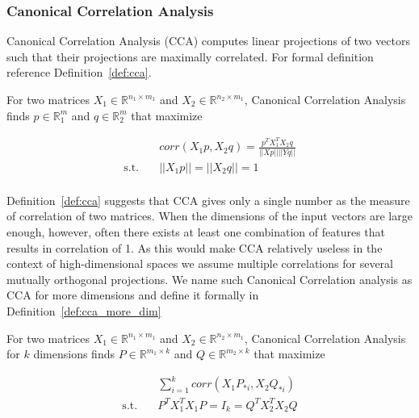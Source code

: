 \subsubsection{Canonical Correlation Analysis}

Canonical Correlation Analysis (CCA) computes linear projections of two vectors
such that their projections are maximally correlated. For formal definition
reference Definition~\ref{def:cca}.

\begin{defn}\label{def:cca}

  For two matrices $X_1 \in \mathbb{R}^{n_1 \times m_1}$ and $X_2 \in
  \mathbb{R}^{n_2 \times m_1}$, Canonical Correlation Analysis finds $p \in
  \mathbb{R}^m_1$ and $q \in \mathbb{R}^m_2$ that maximize

  \begin{equation}
    \begin{split}
      & corr(X_1p, X_2q) = \frac{p^TX_1^TX_2q}{||Xp|| ||Yq||} \\
      \text{s.t.}\quad &||X_1p|| = ||X_2q|| = 1 \\
    \end{split}
  \end{equation}


\end{defn}

Definition~\ref{def:cca} suggests that CCA gives only a single number as the
measure of correlation of two matrices. When the dimensions of the input vectors
are large enough, however, often there exists at least one combination of
features that results in correlation of 1. As this would make CCA relatively
useless in the context of high-dimensional spaces we assume multiple
correlations for several mutually orthogonal projections. We name such Canonical
Correlation analysis as CCA for more dimensions and define it formally in
Definition~\ref{def:cca_more_dim}

\begin{defn}\label{def:cca_more_dim}

  For two matrices $X_1 \in \mathbb{R}^{n_1 \times m_1}$ and $X_2 \in
  \mathbb{R}^{n_2 \times m_1}$, Canonical Correlation Analysis for $k$
  dimensions finds $P \in \mathbb{R}^{m_1 \times k}$ and $Q \in \mathbb{R}^{m_2
  \times k}$ that maximize

  \begin{equation}
    \begin{split}
      &\sum_{i = 1}^k corr(X_1P_{*i}, X_2Q_{*i}) \\
      \text{s.t.}\quad &P^TX_1^TX_1P = I_k = Q^TX_2^TX_2Q \\
    \end{split}
  \end{equation}


\end{defn}


